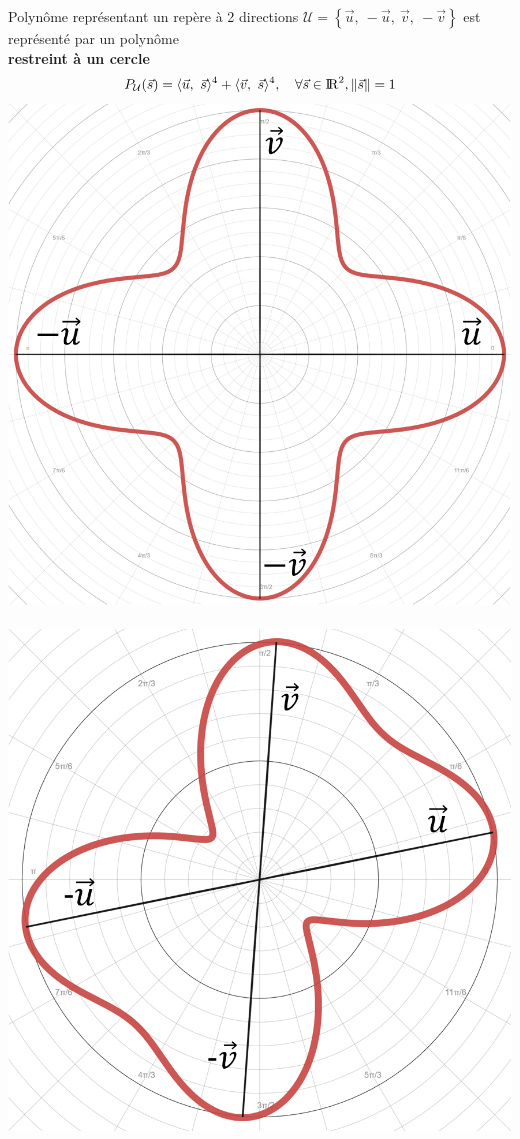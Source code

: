 \documentclass{beamer}
\begin{document}
\begin{frame}{Polynôme représentant un repère à 2 directions}
    \centering
    \small{
    $\mathcal{U} = \left\{\vec{u},\ -\vec{u},\ \vec{v},\ -\vec{v}\right\}$ est représenté par un polynôme \\
    \textbf{restreint à un cercle}
    }
    $$ P_\mathcal{U}(\vec{s}) = \langle \vec{u},\ \vec{s}\rangle^{4} +  \langle \vec{v},\ \vec{s}\rangle^{4}, \ \ \   \forall \vec{s} \in {\rm I\!R}^2, \lVert \vec{s} \rVert = 1$$
    \includegraphics[width=0.4\linewidth]{img_spm_ff/anoted_orthogonal.PNG}
    \ \ \ 
    \includegraphics[width=0.4\linewidth]{img_spm_ff/anoted_polynome.PNG}
\end{frame} 
\end{document}
